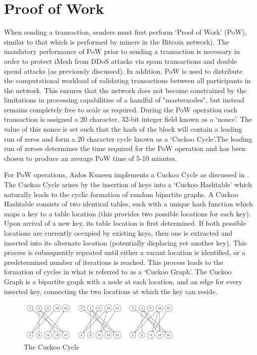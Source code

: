 \documentclass[a4paper,10pt,twocolumn]{article}
\begin{document}
\section{Proof of Work}
\label{sec:PoW}

When sending a transaction, senders must first perform `Proof of Work' (PoW), similar to that which is performed by miners in the 
Bitcoin network). The mandatory performance of PoW prior to sending a transaction is necessary in order to protect iMesh from DDoS 
attacks via spam transactions and double spend attacks (as previously discussed). In addition, PoW is used to distribute the 
computational workload of validating transactions between all participants in the network. This ensures that the network does not 
become constrained by the limitations in processing capabilities of a handful of "masternodes", but instead remains completely free to 
scale as required. During the PoW operation each transaction is assigned a 20 character, 32-bit integer field known as a `nonce'. 
The value of this nonce is set such that the hash of the block will contain a leading run of zeros and form a 20 character cycle known 
as a `Cuckoo Cycle'.The leading run of zeroes determines the time required for the PoW operation and has been chosen to produce an 
average PoW time of 5-10 minutes.

For PoW operations, Aidos Kuneen implements a Cuckoo Cycle as discussed in \cite{cuckoo}. The Cuckoo Cycle arises by the insertion of
keys into a `Cuckoo Hashtable' which naturally leads to the cyclic formation of random bipartite graphs. A Cuckoo Hashtable consists of 
two identical tables, each with a unique hash function which maps a key to a table location (this provides two possible locations for 
each key). Upon arrival of a new key, its table location is first determined. If both possible locations are currently occupied by 
existing keys, then one is extracted and inserted into its alternate location (potentially displacing yet another key). This process is 
subsequently repeated until either a vacant location is identified, or a predetermined number of iterations is reached. This process 
leads to the formation of cycles in what is referred to as a `Cuckoo Graph'. The Cuckoo Graph is a bipartite graph with a node at each 
location, and an edge for every inserted key, connecting the two locations at which the key can reside.

\begin{figure}[ht]
	\begin{center}
	\includegraphics[width=80mm]{cuckoo.png}
	  \caption{The Cuckoo Cycle}
    \label{fig:cuckoo}
	\end{center}
 \end{figure}
\end{document}

